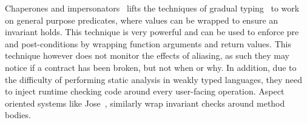 Chaperones and impersonators~\cite{DBLP:conf/oopsla/StricklandTFF12} lifts the techniques of gradual typing~\cite{takikawa2015towards,DBLP:conf/oopsla/TakikawaSDTF12,DBLP:conf/popl/WrigstadNLOV10}
to work on general purpose predicates, where
values can be wrapped to ensure an invariant holds.
This technique is very powerful and can be used to enforce pre and post-conditions by wrapping function arguments and return values.
This technique however does not monitor the effects of aliasing, as such they may notice if a contract has been broken, but not when or why. In addition, due to the difficulty of performing static analysis in weakly typed languages, they need to inject runtime checking code around every user-facing operation.
Aspect oriented systems like Jose~\cite{feldman2006jose}, similarly wrap invariant checks around method bodies.
%
%
%
